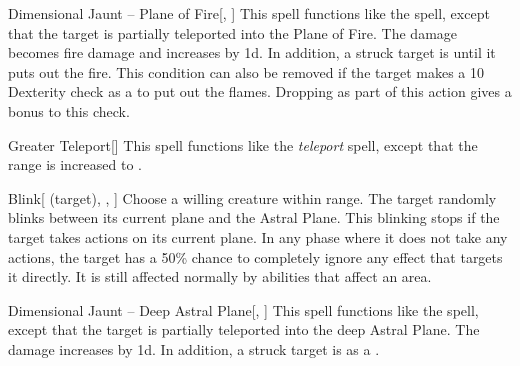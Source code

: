 \lowercase{\hypertarget{spell:Dimensional Jaunt -- Plane of Fire}{}}\label{spell:Dimensional Jaunt -- Plane of Fire}
\begin{apability}[\nth{3}]{\hypertarget{spell:Dimensional Jaunt -- Plane of Fire}{Dimensional Jaunt -- Plane of Fire}}[, ]
This spell functions like the  spell, except that the target is partially teleported into the Plane of Fire.
The damage becomes fire damage and increases by \plus1d.
In addition, a struck target is  until it puts out the fire.
This condition can also be removed if the target makes a  10 Dexterity check as a  to put out the flames.
Dropping  as part of this action gives a  bonus to this check.
\end{apability}
\vspace{0.25em}



\lowercase{\hypertarget{spell:Greater Teleport}{}}\label{spell:Greater Teleport}
\begin{apability}[\nth{3}]{\hypertarget{spell:Greater Teleport}{Greater Teleport}}[]
This spell functions like the \textit{teleport} spell, except that the range is increased to \rngext.
\end{apability}
\vspace{0.25em}



\lowercase{\hypertarget{spell:Blink}{}}\label{spell:Blink}
\begin{attuneability}[\nth{4}]{\hypertarget{spell:Blink}{Blink}}[ (target), , ]
Choose a willing creature within \rngclose range.
The target randomly blinks between its current plane and the Astral Plane.
This blinking stops if the target takes actions on its current plane.
In any phase where it does not take any actions, the target has a 50\% chance to completely ignore any effect that targets it directly.
It is still affected normally by abilities that affect an area.
\end{attuneability}
\vspace{0.25em}



\lowercase{\hypertarget{spell:Dimensional Jaunt -- Deep Astral Plane}{}}\label{spell:Dimensional Jaunt -- Deep Astral Plane}
\begin{apability}[\nth{5}]{\hypertarget{spell:Dimensional Jaunt -- Deep Astral Plane}{Dimensional Jaunt -- Deep Astral Plane}}[, ]
This spell functions like the  spell, except that the target is partially teleported into the deep Astral Plane.
The damage increases by \plus1d.
In addition, a struck target is  as a .
\end{apability}
\vspace{0.25em}



